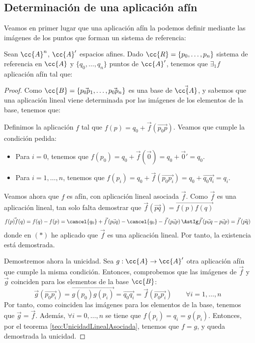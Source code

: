 \subsection{Determinación de una aplicación afín}

Veamos en primer lugar que una aplicación afín la podemos definir mediante las imágenes de los puntos que forman un sistema de referencia:
\begin{teo}
    Sean $\cc{A}^n$, $\cc{A}'$ espacios afines. Dado $\cc{R}=\{p_0,\dots,p_n\}$ sistema de referencia en $\cc{A}$ y $\{q_0,\dots,q_n\}$ puntos de $\cc{A}'$, tenemos que $\exists_1 f$ aplicación afín tal que:
\end{teo}
\begin{proof}
    Como $\cc{B}=\{\vec{p_0p_1},\dots,\vec{p_0p_n}\}$ es una base de $\vec{\cc{A}}$, y sabemos que una aplicación lineal viene determinada por las imágenes de los elementos de la base, tenemos que:

    Definimos la aplicación $f$ tal que $f(p)=q_0+\vec{f}\left(\vec{p_0p}\right)$. Veamos que cumple la condición pedida:
    \begin{itemize}
        \item Para $i=0$, tenemos que $f(p_0)=q_0+\vec{f}(\vec{0}) = q_0+\vec{0}'=q_0$.
        \item Para $i=1,\dots,n$, tenemos que $f(p_i)=q_0+\vec{f}(\vec{p_0p_i}) = q_0+\vec{q_0q_i} = q_i$.
    \end{itemize}

    Veamos ahora que $f$ es afín, con aplicación lineal asociada $\vec{f}$. Como $\vec{f}$ es una aplicación lineal, tan solo falta demostrar que $\vec{f}(\vec{pq}) = \vec{f(p)f(q)}$
    \begin{equation*}
        \vec{f(p)f(q)} = f(q)-f(p) = \cancel{q_0}+\vec{f}\left(\vec{p_0q}\right)-\cancel{q_0}-\vec{f}\left(\vec{p_0p}\right) \AstIg \vec{f}\left(\vec{p_0q} -\vec{p_0p}\right) =\vec{f}\left(\vec{pq}\right)
    \end{equation*}
    donde en $(\ast)$ he aplicado que $\vec{f}$ es una aplicación lineal. Por tanto, la existencia está demostrada.

    Demostremos ahora la unicidad. Sea $g:\cc{A}\to \cc{A}'$ otra aplicación afín que cumple la misma condición. Entonces, comprobemos que las imágenes de $\vec{f}$ y $\vec{g}$ coinciden para los elementos de la base $\cc{B}$:
    \begin{equation*}
        \vec{g}\left(\vec{p_0p_i}\right) = \vec{g(p_0)g(p_i)} = \vec{q_0q_i} = \vec{f}\left(\vec{p_0p_i}\right) \qquad \forall i=1,\dots,n
    \end{equation*}
    Por tanto, como coinciden las imágenes para los elementos de la base, tenemos que $\vec{g}=\vec{f}$. Además, $\forall i=0,\dots,n$ se tiene que $f(p_i)=q_i=g(p_i)$. Entonces, por el teorema \ref{teo:UnicidadLinealAsociada}, tenemos que $f=g$, y queda demostrada la unicidad.
\end{proof}\vspace{1cm}


